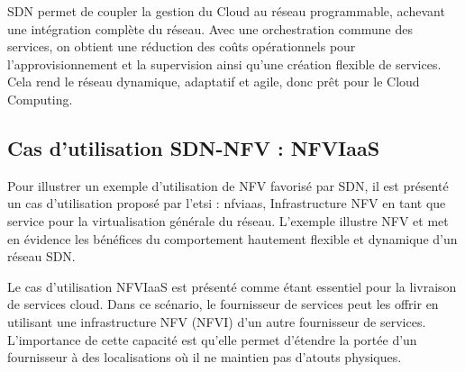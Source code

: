 SDN permet de coupler la gestion du Cloud au réseau programmable, achevant une intégration complète du réseau. Avec une orchestration commune des services, on obtient une réduction des coûts opérationnels pour l'approvisionnement et la supervision ainsi qu'une création flexible de services. Cela rend le réseau dynamique, adaptatif et agile, donc prêt pour le Cloud Computing. \cite{OFSDNNFVand} \cite{realTimeCloudNetworkEnabled} 


\subsection{Cas d'utilisation SDN-NFV : NFVIaaS}

Pour illustrer un exemple d'utilisation de NFV favorisé par SDN, il est présenté un cas d'utilisation proposé par l'\gls{etsi} : \gls{nfv}\gls{iaas}, Infrastructure NFV en tant que service pour la virtualisation générale du réseau. L'exemple illustre NFV et met en évidence les bénéfices du comportement hautement flexible et dynamique d'un réseau SDN.

Le cas d'utilisation NFVIaaS est présenté comme étant essentiel pour la livraison de services cloud. Dans ce scénario, le fournisseur de services peut les offrir en utilisant une infrastructure NFV (NFVI) d'un autre fournisseur de services. L'importance de cette capacité est qu'elle permet d'étendre la portée d'un fournisseur à des localisations où il ne maintien pas d'atouts physiques.

